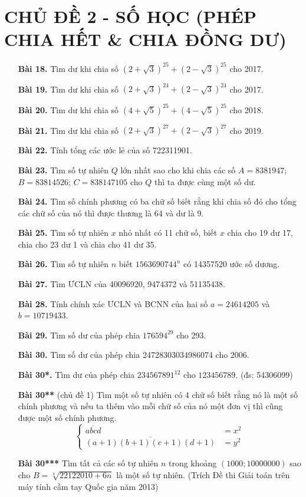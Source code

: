 \documentclass[12pt,a4paper]{article}
\begin{document}
\section*{CHỦ ĐỀ 2 - SỐ HỌC (PHÉP CHIA HẾT \& CHIA ĐỒNG DƯ)}
\begin{enumerate}
\item[\textbf{Bài 18.}] Tìm dư khi chia số $(2+\sqrt{3})^{25} + (2-\sqrt{3})^{25}$ cho 2017.
\item[\textbf{Bài 19.}] Tìm dư khi chia số $(2+\sqrt{3})^{24} + (2-\sqrt{3})^{24}$ cho 2017.
\item[\textbf{Bài 20.}] Tìm dư khi chia số $(4+\sqrt{5})^{25} + (4-\sqrt{5})^{25}$ cho 2018.
\item[\textbf{Bài 21.}] Tìm dư khi chia số $(2+\sqrt{3})^{27} + (2-\sqrt{3})^{27}$ cho 2019.
\item[\textbf{Bài 22.}] Tính tổng các ước lẻ của số 722311901.
\item[\textbf{Bài 23.}] Tìm số tự nhiên $Q$ lớn nhất sao cho khi chia các số $A=8381947$; $B=83814526$; $C=838147105$ cho $Q$ thì ta được cùng một số dư.
\item[\textbf{Bài 24.}] Tìm số chính phương có ba chữ số biết rằng khi chia số đó cho tổng các chữ số của nó thì được thương là 64 và dư là 9.
\item[\textbf{Bài 25.}] Tìm số tự nhiên $x$ nhỏ nhất có 11 chữ số, biết $x$ chia cho 19 dư 17, chia cho 23 dư 1 và chia cho 41 dư 35.
\item[\textbf{Bài 26.}] Tìm số tự nhiên $n$ biết $1563690744^n$ có 14357520 ước số dương.
\item[\textbf{Bài 27.}] Tìm ƯCLN của 40096920, 9474372 và 51135438.
\item[\textbf{Bài 28.}] Tính chính xác ƯCLN và BCNN của hai số $a=24614205$ và $b=10719433$.
\item[\textbf{Bài 29.}] Tìm số dư của phép chia $176594^{29}$ cho 293.
\item[\textbf{Bài 30.}] Tìm số dư của phép chia 24728303034986074 cho 2006.
\item[\textbf{Bài 30*.}] Tìm dư của phép chia $234567891^{12}$ cho $123456789$. (đs: 54306099)
\item[\textbf{Bài 30**}] (chủ đề 1) Tìm một số tự nhiên có 4 chữ số biết rằng nó là một số chính phương và nếu ta thêm vào mỗi chữ số của nó một đơn vị thì cũng được một số chính phương.
\[\begin{cases}\overline{abcd} & =x^{2}\\\overline{(a+1)(b+1)(c+1)(d+1)} & =y^{2}\end{cases}\]
\item[\textbf{Bài 30***}] Tìm tất cả các số tự nhiên $n$ trong khoảng $(1000;10000000)$ sao cho $B = \sqrt[4]{22122010+ 6n}$ là một số tự nhiên. (Trích Đề thi Giải toán trên máy tính cầm tay Quốc gia năm 2013)
\end{enumerate}
\newpage
\end{document}
